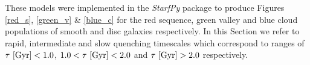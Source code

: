 \documentclass[useAMS,usenatbib]{mn2e}
\def\changed    {\color{titlecol} }
\begin{document}

{\changed These models were implemented in the \emph{StarfPy} package to produce Figures \ref{red_s}, \ref{green_v} \& \ref{blue_c} for the red sequence, green valley and blue cloud populations of smooth and disc galaxies respectively.} In this Section we refer to rapid, intermediate and slow quenching timescales which correspond to ranges of {\changed $\tau ~\rm{[Gyr]} < 1.0$, $1.0 < \tau ~\rm{[Gyr]} < 2.0$ and $\tau ~\rm{[Gyr]} > 2.0$} respectively. 
\end{document}
